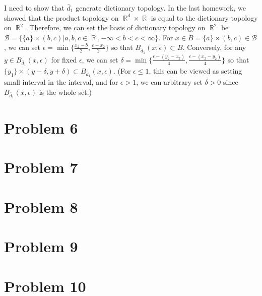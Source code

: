 \documentclass{article}
\DeclareMathOperator{\rr}{\mathbb{R}}
\newcommand{\B}{\mathcal{B}}
\begin{document}
I need to show that $\bar{d}_1$ generate dictionary topology. In the last homework, we showed that the product topology on $\rr^d\times \rr$ is equal to the dictionary topology on $\rr^2$. Therefore, we can set the basis of dictionary topology on $\rr^2$ be $\B=\{\{a\}\times(b,c)|a,b,c\in\rr, -\infty<b<c<\infty\}$. For $x\in B=\{a\}\times(b,c)\in \B$, we can set $\epsilon=\min\{\frac{x_2-b}{2}, \frac{c-x_2}{2}\}$ so that $B_{\bar{d}_1}(x, \epsilon)\subset B$. Conversely, for any $y\in B_{\bar{d}_1}(x, \epsilon)$ for fixed $\epsilon$, we can set $\delta=\min\{\frac{\epsilon-(y_2-x_2)}{4}, \frac{\epsilon-(x_2-y_2)}{4}\}$ so that $\{y_1\}\times (y-\delta, y+\delta)\subset B_{\bar{d}_1}(x, \epsilon)$. (For $\epsilon\leq 1$, this can be viewed as setting small interval in the interval, and for $\epsilon>1$, we can arbitrary set $\delta>0$ since $B_{\bar{d}_1}(x, \epsilon)$ is the whole set.)

\section*{Problem 6}
\section*{Problem 7}
\section*{Problem 8}
\section*{Problem 9}
\section*{Problem 10}
\end{document}
